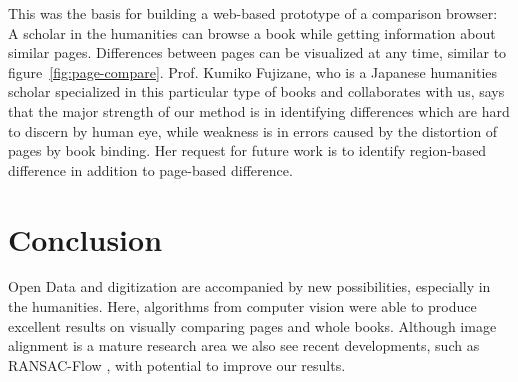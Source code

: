 \documentclass{ltjarticle}
\begin{document}
This was the basis for building a web-based prototype of a comparison browser: A scholar in the humanities can browse a book while getting information about similar pages. Differences between pages can be visualized at any time, similar to figure~\ref{fig:page-compare}. Prof. Kumiko Fujizane, who is a Japanese humanities scholar specialized in this particular type of books and collaborates with us, says that the major strength of our method is in identifying differences which are hard to discern by human eye, while weakness is in errors caused by the distortion of pages by book binding. Her request for future work is to identify region-based difference in addition to page-based difference.

\section{Conclusion}

Open Data and digitization are accompanied by new possibilities, especially in the humanities. Here, algorithms from computer vision were able to produce excellent results on visually comparing pages and whole books. Although image alignment is a mature research area we also see recent developments, such as RANSAC-Flow \cite{shen2019ransac}, with potential to improve our results.

\printbibliography
\end{document}
